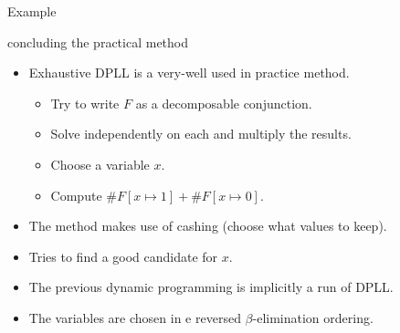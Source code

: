 \begin{frame}{Example}
\end{frame}
\begin{frame}[t]{concluding the practical method}
	\begin{itemize}[<+->]
		\item Exhaustive DPLL is a very-well used in practice method.
			\begin{itemize}
				\item Try to write $F$ as a decomposable conjunction. 
				\item[] \hspace{1cm}Solve independently on each and multiply the results.
				\item Choose a variable $x$.
				\item[] \hspace{1cm}Compute $\#F[x\mapsto 1] + \#F[x\mapsto 0]$.
			\end{itemize}
		\item The method makes use of cashing (choose what values to keep).
		\item Tries to find a good candidate for $x$.
		\item The previous dynamic programming is implicitly a run of DPLL. 
		\item The variables are chosen in e reversed $\beta$-elimination ordering. 
	\end{itemize}
\end{frame}
